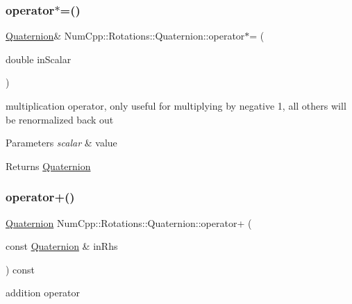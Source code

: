 \subsubsection{\texorpdfstring{operator$\ast$=()}{operator*=()}\hspace{0.1cm}{\footnotesize\ttfamily [2/2]}}
{\footnotesize\ttfamily \mbox{\hyperlink{class_num_cpp_1_1_rotations_1_1_quaternion}{Quaternion}}\& Num\+Cpp\+::\+Rotations\+::\+Quaternion\+::operator$\ast$= (\begin{DoxyParamCaption}\item[{double}]{in\+Scalar }\end{DoxyParamCaption})\hspace{0.3cm}{\ttfamily [inline]}}

multiplication operator, only useful for multiplying by negative 1, all others will be renormalized back out


\begin{DoxyParams}{Parameters}
{\em scalar} & value \\
\hline
\end{DoxyParams}
\begin{DoxyReturn}{Returns}
\mbox{\hyperlink{class_num_cpp_1_1_rotations_1_1_quaternion}{Quaternion}} 
\end{DoxyReturn}
\mbox{\label{class_num_cpp_1_1_rotations_1_1_quaternion_ae470095e7fd118597c6612f9e84cd9d3}} 
\subsubsection{\texorpdfstring{operator+()}{operator+()}}
{\footnotesize\ttfamily \mbox{\hyperlink{class_num_cpp_1_1_rotations_1_1_quaternion}{Quaternion}} Num\+Cpp\+::\+Rotations\+::\+Quaternion\+::operator+ (\begin{DoxyParamCaption}\item[{const \mbox{\hyperlink{class_num_cpp_1_1_rotations_1_1_quaternion}{Quaternion}} \&}]{in\+Rhs }\end{DoxyParamCaption}) const\hspace{0.3cm}{\ttfamily [inline]}}

addition operator


